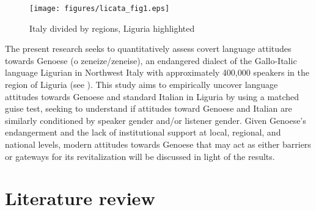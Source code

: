 \documentclass[output=paper,colorlinks,citecolor=brown]{langscibook}
\begin{document}
\begin{figure}
    \texttt{[image: figures/licata\_fig1.eps]}
    \caption{Italy divided by regions, Liguria highlighted\protect\footnotemark}
    \label{fig:licata:01}
\end{figure}

\par The present research seeks to quantitatively assess covert language attitudes towards Genoese (o zeneize/zeneise), an endangered dialect of the Gallo-Italic language Ligurian in Northwest Italy with approximately 400,000 speakers in the region of Liguria (see ). This study aims to empirically uncover language attitudes towards Genoese and standard Italian in Liguria by using a matched guise test, seeking to understand if attitudes toward Genoese and Italian are similarly conditioned by speaker gender and/or listener gender. Given Genoese’s endangerment and the lack of institutional support at local, regional, and national levels, modern attitudes towards Genoese that may act as either barriers or gateways for its revitalization will be discussed in light of the results.



\section{Literature review}
\end{document}
